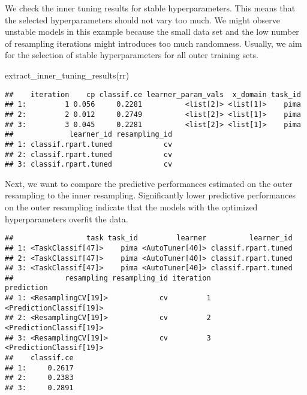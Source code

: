\documentclass[
]{scrbook}
\newenvironment{Shaded}{\begin{snugshade}}{\end{snugshade}}
\newcommand{\FunctionTok}[1]{\textcolor[rgb]{0.00,0.00,0.00}{#1}}
\newcommand{\NormalTok}[1]{#1}
\newcommand{\SpecialCharTok}[1]{\textcolor[rgb]{0.00,0.00,0.00}{#1}}
\renewenvironment{Shaded} {\begin{snugshade}\small} {\end{snugshade}}
\begin{document}
We check the inner tuning results for stable hyperparameters.
This means that the selected hyperparameters should not vary too much.
We might observe unstable models in this example because the small data set and the low number of resampling iterations might introduces too much randomness.
Usually, we aim for the selection of stable hyperparameters for all outer training sets.

\begin{Shaded}
\begin{Highlighting}[]
\FunctionTok{extract\_inner\_tuning\_results}\NormalTok{(rr)}
\end{Highlighting}
\end{Shaded}

\begin{verbatim}
##    iteration    cp classif.ce learner_param_vals  x_domain task_id
## 1:         1 0.056     0.2281          <list[2]> <list[1]>    pima
## 2:         2 0.012     0.2749          <list[2]> <list[1]>    pima
## 3:         3 0.045     0.2281          <list[2]> <list[1]>    pima
##             learner_id resampling_id
## 1: classif.rpart.tuned            cv
## 2: classif.rpart.tuned            cv
## 3: classif.rpart.tuned            cv
\end{verbatim}

Next, we want to compare the predictive performances estimated on the outer resampling to the inner resampling.
Significantly lower predictive performances on the outer resampling indicate that the models with the optimized hyperparameters overfit the data.

\begin{Shaded}
\end{Shaded}

\begin{verbatim}
##                 task task_id         learner          learner_id
## 1: <TaskClassif[47]>    pima <AutoTuner[40]> classif.rpart.tuned
## 2: <TaskClassif[47]>    pima <AutoTuner[40]> classif.rpart.tuned
## 3: <TaskClassif[47]>    pima <AutoTuner[40]> classif.rpart.tuned
##            resampling resampling_id iteration              prediction
## 1: <ResamplingCV[19]>            cv         1 <PredictionClassif[19]>
## 2: <ResamplingCV[19]>            cv         2 <PredictionClassif[19]>
## 3: <ResamplingCV[19]>            cv         3 <PredictionClassif[19]>
##    classif.ce
## 1:     0.2617
## 2:     0.2383
## 3:     0.2891
\end{verbatim}
\end{document}
